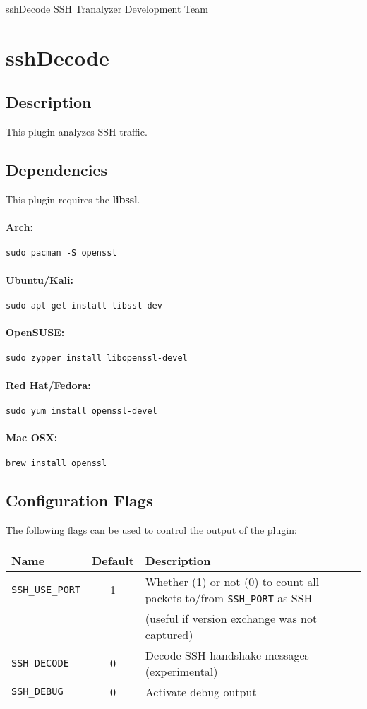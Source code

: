 \documentclass[documentation]{subfiles}
\begin{document}
\trantitle
    {sshDecode}
    {SSH}
    {Tranalyzer Development Team}

\section{sshDecode}\label{s:sshDecode}

\subsection{Description}
This plugin analyzes SSH traffic.

\subsection{Dependencies}
This plugin requires the {\bf libssl}.
\paragraph{Arch:} {\tt sudo pacman -S openssl}
\paragraph{Ubuntu/Kali:} {\tt sudo apt-get install libssl-dev}
\paragraph{OpenSUSE:} {\tt sudo zypper install libopenssl-devel}
\paragraph{Red Hat/Fedora:} {\tt sudo yum install openssl-devel}
\paragraph{Mac OSX:} {\tt brew install openssl}

\subsection{Configuration Flags}
The following flags can be used to control the output of the plugin:
\begin{longtable}{lcl}
    \toprule
    {\bf Name} & {\bf Default} & {\bf Description}\\
    \midrule\endhead%
    {\tt SSH\_USE\_PORT} & 1 & Whether (1) or not (0) to count all packets to/from {\tt SSH\_PORT} as SSH\\
                             && (useful if version exchange was not captured)\\
    {\tt SSH\_DECODE}    & 0 & Decode SSH handshake messages (experimental)\\
    {\tt SSH\_DEBUG}     & 0 & Activate debug output\\
    \bottomrule
\end{longtable}
\end{document}
